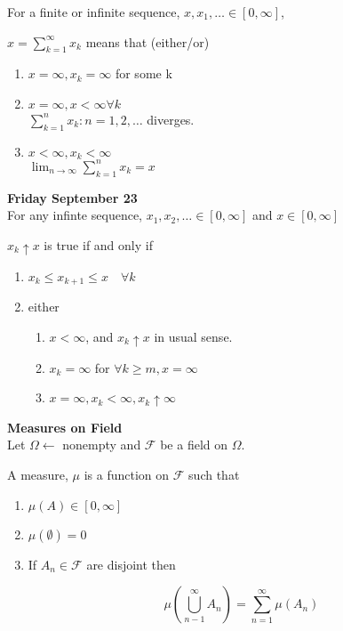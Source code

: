 \documentclass[11pt,fleqn]{book} %
\begin{document}
	For a finite or infinite sequence, $x, x_1, \dots \in [0, \infty]$,

	$x = \displaystyle \sum^\infty_{k=1} x_k $ means that (either/or)

	\begin{enumerate}
		\item $x = \infty, x_k = \infty$ for some k
		\item $x = \infty, x < \infty \forall k$\\
			$\sum^n_{k=1} x_k: n = 1, 2, \dots$ diverges.
		\item $x< \infty, x_k < \infty $\\

		$\lim_{n\rightarrow \infty} \sum^n_{k=1} x_k = x$

	\end{enumerate}

\textbf{Friday September 23}\\


	For any infinte sequence, $x_1, x_2, \dots \in [0, \infty] $ and $x\in [0,\infty]$

	$x_k \uparrow x $ is true if and only if
	
	\begin{enumerate}
		\item $x_k \leq x_{k+1} \leq x \quad \forall k$
		\item either
			\begin{enumerate}
				\item $x < \infty$, and $x_k \uparrow x$ in usual sense.
				\item $x_k = \infty$ for $\forall k\geq m, x = \infty$
				\item $x = \infty, x_k < \infty, x_k \uparrow \infty$
			\end{enumerate}
	\end{enumerate}

	\textbf{Measures on Field}\\

	Let $\Omega \leftarrow$ nonempty and $\mathcal{F}$ be a field on $\Omega$.


	\begin{definition}
		A measure, $\mu$ is a function on $\mathcal{F}$ such that 

	\begin{enumerate}
		\item $\mu(A) \in [0, \infty]$
		\item $\mu(\emptyset) = 0$
		\item If $A_n \in \mathcal{F}$ are disjoint then 

		$$\mu(\bigcup^\infty_{n-1} A_n)  = \displaystyle \sum^\infty_{n=1} \mu(A_n)$$ 
	\end{enumerate}
\end{definition}
\end{document}

